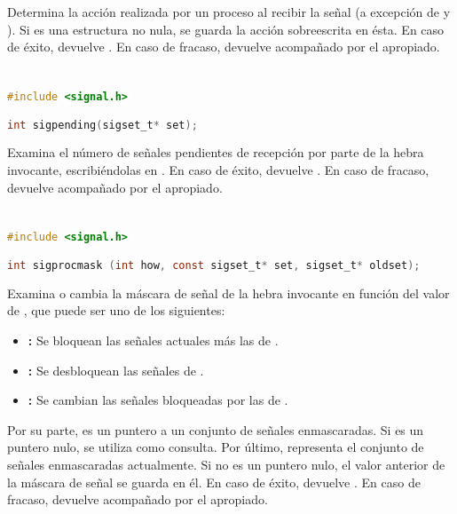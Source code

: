 Determina la acción  realizada por un proceso al recibir la señal  (a excepción de  y ).
Si  es una estructura no nula, se guarda la acción sobreescrita en ésta.
En caso de éxito, devuelve .
En caso de fracaso, devuelve  acompañado por el  apropiado.

\section{}\label{sigpending}

\begin{lstlisting}[language=C]
#include <signal.h>

int sigpending(sigset_t* set);
\end{lstlisting}

Examina el número de señales pendientes de recepción por parte de la hebra invocante, escribiéndolas en .
En caso de éxito, devuelve .
En caso de fracaso, devuelve  acompañado por el  apropiado.

\section{}\label{sigprocmask}

\begin{lstlisting}[language=C]
#include <signal.h>

int sigprocmask (int how, const sigset_t* set, sigset_t* oldset);
\end{lstlisting}

Examina o cambia la máscara de señal de la hebra invocante en función del valor de , que puede ser uno de los siguientes:

\begin{itemize}
	\item{}\textbf{:} Se bloquean las señales actuales más las de .
	\item{}\textbf{:} Se desbloquean las señales de .
	\item{}\textbf{:} Se cambian las señales bloqueadas por las de .
\end{itemize}

Por su parte,  es un puntero a un conjunto de señales enmascaradas.
Si es un puntero nulo,  se utiliza como consulta.
Por último,  representa el conjunto de señales enmascaradas actualmente.
Si no es un puntero nulo, el valor anterior de la máscara de señal se guarda en él.
En caso de éxito, devuelve .
En caso de fracaso, devuelve  acompañado por el  apropiado.

